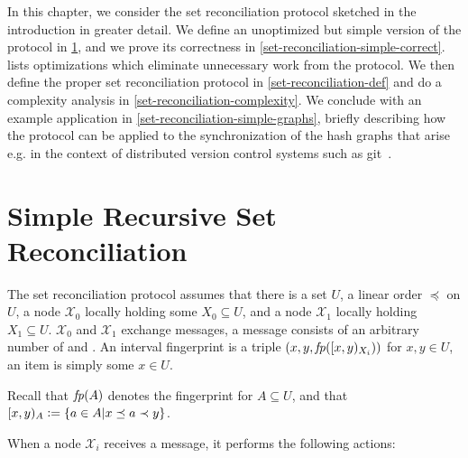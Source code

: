 
In this chapter, we consider the set reconciliation protocol sketched in the introduction in greater detail.
We define an unoptimized but simple version of the protocol in \cref{set-reconciliation-simple-def}, and we prove its correctness in \cref{set-reconciliation-simple-correct}.  lists optimizations which eliminate unnecessary work from the protocol. We then define the proper set reconciliation protocol in \cref{set-reconciliation-def} and  do a complexity analysis in \cref{set-reconciliation-complexity}. We conclude with an example application in \cref{set-reconciliation-simple-graphs}, briefly describing how the protocol can be applied to the synchronization of the hash graphs that arise e.g. in the context of distributed version control systems such as git~\cite{chacon2014pro}.

\section{Simple Recursive Set Reconciliation}
\label{set-reconciliation-simple-def}

The set reconciliation protocol assumes that there is a set $U$, a linear order $\preceq$ on $U$, a node $\mathcal{X}_0$ locally holding some $X_0 \subseteq U$, and a node $\mathcal{X}_1$ locally holding $X_1 \subseteq U$.
$\mathcal{X}_0$ and $\mathcal{X}_1$ exchange messages, a message consists of an arbitrary number of  and .
An interval fingerprint is a triple $({x}, {y}, {\mathit{fp}([{x},{y})_{X_i})})$ for $x, y \in U$, an item is simply some $x \in U$.

Recall that $\mathit{fp}(A)$ denotes the fingerprint for $A \subseteq U$, and that $[{x},{y})_{A} \vcentcolon= \{a \in A | x \preceq a \prec y\}$.

When a node $\mathcal{X}_i$ receives a message, it performs the following actions:

